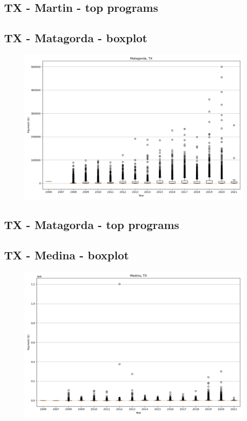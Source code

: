 \subsection*{TX - Martin - top programs}

\newpage
\subsection*{TX - Matagorda - boxplot}
\begin{figure}[h]
\centering
\includegraphics[width=7in]{../output/boxplots/counties/Matagorda-TX_boxplot.png}
\end{figure}


\subsection*{TX - Matagorda - top programs}

\newpage
\subsection*{TX - Medina - boxplot}
\begin{figure}[h]
\centering
\includegraphics[width=7in]{../output/boxplots/counties/Medina-TX_boxplot.png}
\end{figure}


